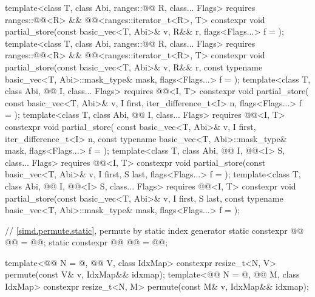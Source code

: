 \begin{codeblock}
{  template<class T, class Abi, ranges::@@ R, class... Flags>
    requires ranges::@@<R> && @@<ranges::iterator_t<R>, T>
    constexpr void partial_store(const basic_vec<T, Abi>& v, R&& r,
                                 flags<Flags...> f = {});
  template<class T, class Abi, ranges::@@ R, class... Flags>
    requires ranges::@@<R> && @@<ranges::iterator_t<R>, T>
    constexpr void partial_store(const basic_vec<T, Abi>& v, R&& r,
      const typename basic_vec<T, Abi>::mask_type& mask, flags<Flags...> f = {});
  template<class T, class Abi, @@ I, class... Flags>
    requires @@<I, T>
    constexpr void partial_store(
      const basic_vec<T, Abi>& v, I first, iter_difference_t<I> n, flags<Flags...> f = {});
  template<class T, class Abi, @@ I, class... Flags>
    requires @@<I, T>
    constexpr void partial_store(
      const basic_vec<T, Abi>& v, I first, iter_difference_t<I> n,
      const typename basic_vec<T, Abi>::mask_type& mask, flags<Flags...> f = {});
  template<class T, class Abi, @@ I, @@<I> S, class... Flags>
    requires @@<I, T>
    constexpr void partial_store(const basic_vec<T, Abi>& v, I first, S last,
                                 flags<Flags...> f = {});
  template<class T, class Abi, @@ I, @@<I> S, class... Flags>
    requires @@<I, T>
    constexpr void partial_store(const basic_vec<T, Abi>& v, I first, S last,
      const typename basic_vec<T, Abi>::mask_type& mask, flags<Flags...> f = {});

  // \ref{simd.permute.static}, permute by static index generator
  static constexpr @@ @@   = @@;
  static constexpr @@ @@ = @@;

  template<@@ N = @\seebelow@, @@ V, class IdxMap>
    constexpr resize_t<N, V> permute(const V& v, IdxMap&& idxmap);
  template<@@ N = @\seebelow@, @@ M, class IdxMap>
    constexpr resize_t<N, M> permute(const M& v, IdxMap&& idxmap);

}
\end{codeblock}
